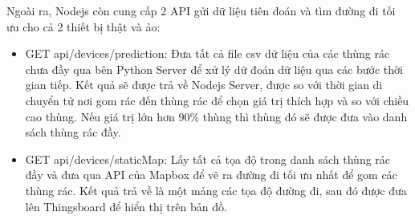 Ngoài ra, Nodejs còn cung cấp 2 API gửi dữ liệu tiên đoán và tìm đường đi tối ưu cho cả 2 thiết bị thật và ảo:
\begin{itemize}
    \item GET api/devices/prediction: Đưa tất cả file csv dữ liệu của các thùng rác chưa đầy qua bên Python Server để xử lý dữ đoán dữ liệu qua các bước thời gian tiếp. Kết quả sẽ được trả về Nodejs Server, được so với thời gian di chuyển tử nơi gom rác đến thùng rác để chọn giá trị thích hợp và so với chiều cao thùng. Nếu giá trị lớn hơn 90\% thùng thì thùng đó sẽ được đưa vào danh sách thùng rác đầy.
    \item GET api/devices/staticMap: Lấy tất cả tọa độ trong danh sách thùng rác đầy và đưa qua API của Mapbox để vẽ ra đường đi tối ưu nhất để gom các thùng rác. Kết quả trả về là một mảng các tọa độ đường đi, sau đó được đưa lên Thingsboard để hiển thị trên bản đồ.
\end{itemize}

